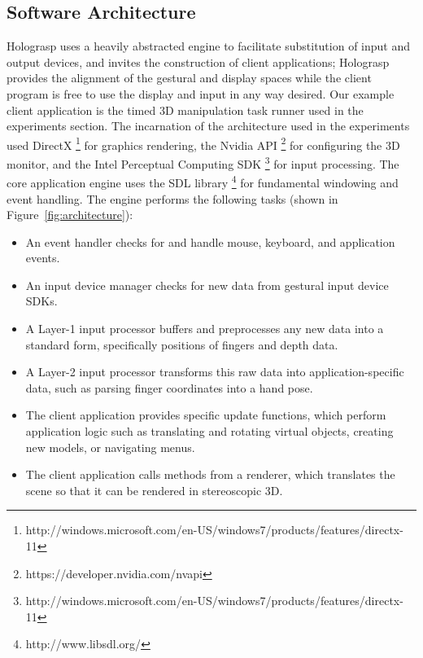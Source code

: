 \documentclass[pageno]{jpaper}
\begin{document}
\subsection{Software Architecture}
Holograsp uses a heavily abstracted engine to facilitate substitution of input and output devices, and invites the construction of
client applications; Holograsp provides the alignment of the
gestural and display spaces while the client program is free to use the display and input in any way desired. Our example client application
is the timed 3D manipulation task runner used in the experiments section. The incarnation of the architecture used in the
experiments used DirectX \footnote{http://windows.microsoft.com/en-US/windows7/products/features/directx-11} for graphics rendering, the Nvidia API \footnote{https://developer.nvidia.com/nvapi} for configuring the 3D monitor, and the Intel Perceptual
Computing SDK \footnote{http://windows.microsoft.com/en-US/windows7/products/features/directx-11} for input processing.
The core application engine uses the SDL library \footnote{http://www.libsdl.org/} for fundamental windowing and event handling.
The engine performs the following tasks (shown in Figure~\ref{fig:architecture}):
\begin{itemize}
\item An event handler checks for and handle mouse, keyboard, and application events.
\item An input device manager checks for new data from gestural input device SDKs.
\item A Layer-1 input processor buffers and preprocesses any new data into a standard form, specifically positions of fingers and depth data.
\item A Layer-2 input processor transforms this raw data into application-specific data, such as parsing finger coordinates into a hand pose.
\item The client application provides specific update functions, which perform
application logic such as translating and rotating virtual objects, creating new models, or navigating menus.
\item The client application calls methods from a renderer, which translates the scene so that it can be rendered in stereoscopic 3D.
\end{itemize}
\end{document}
